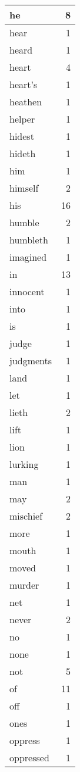\begin{center}
\begin{longtable}{l|r}
he & 8 \\ \hline
hear & 1 \\ \hline
heard & 1 \\ \hline
heart & 4 \\ \hline
heart's & 1 \\ \hline
heathen & 1 \\ \hline
helper & 1 \\ \hline
hidest & 1 \\ \hline
hideth & 1 \\ \hline
him & 1 \\ \hline
himself & 2 \\ \hline
his & 16 \\ \hline
humble & 2 \\ \hline
humbleth & 1 \\ \hline
imagined & 1 \\ \hline
in & 13 \\ \hline
innocent & 1 \\ \hline
into & 1 \\ \hline
is & 1 \\ \hline
judge & 1 \\ \hline
judgments & 1 \\ \hline
land & 1 \\ \hline
let & 1 \\ \hline
lieth & 2 \\ \hline
lift & 1 \\ \hline
lion & 1 \\ \hline
lurking & 1 \\ \hline
man & 1 \\ \hline
may & 2 \\ \hline
mischief & 2 \\ \hline
more & 1 \\ \hline
mouth & 1 \\ \hline
moved & 1 \\ \hline
murder & 1 \\ \hline
net & 1 \\ \hline
never & 2 \\ \hline
no & 1 \\ \hline
none & 1 \\ \hline
not & 5 \\ \hline
of & 11 \\ \hline
off & 1 \\ \hline
ones & 1 \\ \hline
oppress & 1 \\ \hline
oppressed & 1 \\ \hline

\end{longtable}
\end{center}
